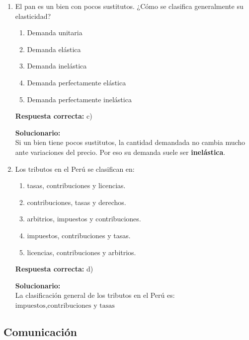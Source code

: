 \begin{enumerate}
	
	
	\item El pan es un bien con pocos sustitutos. ¿Cómo se clasifica generalmente su elasticidad?
	\begin{enumerate}[label=\alph*)]
		\item Demanda unitaria
		\item Demanda elástica
		\item Demanda inelástica
		\item Demanda perfectamente elástica
		\item Demanda perfectamente inelástica
	\end{enumerate}
	\textbf{Respuesta correcta:} c)
	
	\vspace{2mm}
	\textbf{Solucionario:}\\
	Si un bien tiene pocos sustitutos, la cantidad demandada no cambia mucho ante variaciones del precio.  
	Por eso su demanda suele ser \textbf{inelástica}.
	
	\vspace{6mm}
	
	\item Los tributos en el Perú se clasifican en:
	\begin{enumerate}[label=\alph*)]
		\item tasas, contribuciones y licencias.
		\item contribuciones, tasas y derechos.
		\item arbitrios, impuestos y contribuciones.
		\item impuestos, contribuciones y tasas.
		\item licencias, contribuciones y arbitrios.
	\end{enumerate}
	\textbf{Respuesta correcta:} d)
	
	\vspace{2mm}
	\textbf{Solucionario:}\\
	La clasificación general de los tributos en el Perú es:
	$ \text{impuestos}, \text{contribuciones} \text{ y } \text{tasas} $
	
	\vspace{6mm}
	
\end{enumerate}

\subsection*{Comunicación}

